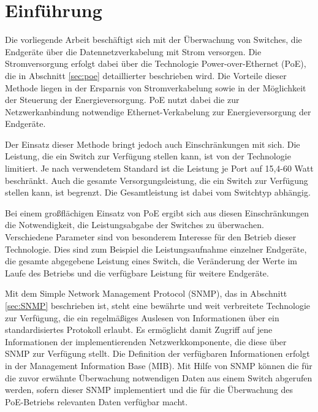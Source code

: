 \section{Einführung}
\label{sec:intro}
Die vorliegende Arbeit beschäftigt sich mit der Überwachung von Switches, die Endgeräte über die Datennetzverkabelung mit Strom versorgen. Die Stromversorgung erfolgt dabei über die Technologie Power-over-Ethernet (PoE), die in Abschnitt \ref{sec:poe} detaillierter beschrieben wird. Die Vorteile dieser Methode liegen in der Ersparnis von Stromverkabelung sowie in der Möglichkeit der Steuerung der Energieversorgung. PoE nutzt dabei die zur Netzwerkanbindung notwendige Ethernet-Verkabelung zur Energieversorgung der Endgeräte.

Der Einsatz dieser Methode bringt jedoch auch Einschränkungen mit sich. Die Leistung, die ein Switch zur Verfügung stellen kann, ist von der Technologie limitiert. Je nach verwendetem Standard ist die Leistung je Port auf 15,4-60 Watt beschränkt. Auch die gesamte Versorgungsleistung, die ein Switch zur Verfügung stellen kann, ist begrenzt. Die Gesamtleistung ist dabei vom Switchtyp abhängig. 

Bei einem großflächigen Einsatz von PoE ergibt sich aus diesen Einschränkungen die Notwendigkeit, die Leistungsabgabe der Switches zu überwachen. Verschiedene Parameter sind von besonderem Interesse für den Betrieb dieser Technologie. Dies sind zum Beispiel die Leistungsaufnahme einzelner Endgeräte, die gesamte abgegebene Leistung eines Switch, die Veränderung der Werte im Laufe des Betriebs und die verfügbare Leistung für weitere Endgeräte.

Mit dem Simple Network Management Protocol (SNMP), das in Abschnitt \ref{sec:SNMP} beschrieben ist, steht eine bewährte und weit verbreitete Technologie zur Verfügung, die ein regelmäßiges Auslesen von Informationen über ein standardisiertes Protokoll erlaubt. Es ermöglicht damit Zugriff auf jene Informationen der implementierenden Netzwerkkomponente, die diese über SNMP zur Verfügung stellt. Die Definition der verfügbaren Informationen erfolgt in der Management Information Base (MIB). Mit Hilfe von SNMP können die für die zuvor erwähnte Überwachung notwendigen Daten aus einem Switch abgerufen werden, sofern dieser SNMP implementiert und die für die Überwachung des PoE-Betriebs relevanten Daten verfügbar macht.

